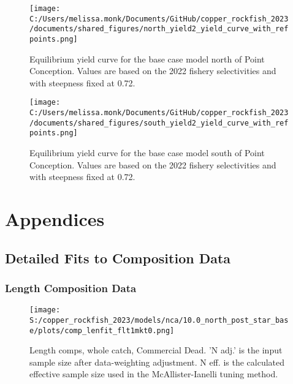 \documentclass[11pt,
  letterpaper,
]{article}
\begin{document}
\begin{figure}
{\centering
\texttt{[image: C:/Users/melissa.monk/Documents/GitHub/copper\_rockfish\_2023/documents/shared\_figures/north\_yield2\_yield\_curve\_with\_refpoints.png]}
}
\caption{Equilibrium yield curve for the base case model north of Point Conception. Values are based on the 2022
fishery selectivities and with steepness fixed at 0.72.\label{fig:yield-north}}
\end{figure}

\pagebreak

\begin{figure}
{\centering
\texttt{[image: C:/Users/melissa.monk/Documents/GitHub/copper\_rockfish\_2023/documents/shared\_figures/south\_yield2\_yield\_curve\_with\_refpoints.png]}
}
\caption{Equilibrium yield curve for the base case model south of Point Conception. Values are based on the 2022
fishery selectivities and with steepness fixed at 0.72.\label{fig:yield-south}}
\end{figure}

\pagebreak

\section{Appendices}\label{appendices}

\subsection{Detailed Fits to Composition Data}\label{detailed-fit-comps}

\subsubsection{Length Composition Data}\label{length-data}

\begin{figure}
{\centering
\texttt{[image: S:/copper\_rockfish\_2023/models/nca/10.0\_north\_post\_star\_base/plots/comp\_lenfit\_flt1mkt0.png]}
}
\caption{Length comps, whole catch, Commercial Dead.  'N adj.' is the input sample size after data-weighting adjustment. N eff. is the calculated effective sample size used in the McAllister-Ianelli tuning method.\label{fig:comp-lenfit-flt1mkt0}}
\end{figure}
\end{document}
